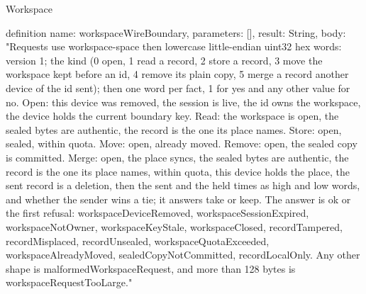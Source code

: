 \begin{lexlean}{Workspace}
\begin{semanticmodule}
definition{
  name: workspaceWireBoundary,
  parameters: [],
  result: String,
  body: "Requests use workspace-space then lowercase little-endian uint32 hex words: version 1; the kind (0 open, 1 read a record, 2 store a record, 3 move the workspace kept before an id, 4 remove its plain copy, 5 merge a record another device of the id sent); then one word per fact, 1 for yes and any other value for no. Open: this device was removed, the session is live, the id owns the workspace, the device holds the current boundary key. Read: the workspace is open, the sealed bytes are authentic, the record is the one its place names. Store: open, sealed, within quota. Move: open, already moved. Remove: open, the sealed copy is committed. Merge: open, the place syncs, the sealed bytes are authentic, the record is the one its place names, within quota, this device holds the place, the sent record is a deletion, then the sent and the held times as high and low words, and whether the sender wins a tie; it answers take or keep. The answer is ok or the first refusal: workspaceDeviceRemoved, workspaceSessionExpired, workspaceNotOwner, workspaceKeyStale, workspaceClosed, recordTampered, recordMisplaced, recordUnsealed, workspaceQuotaExceeded, workspaceAlreadyMoved, sealedCopyNotCommitted, recordLocalOnly. Any other shape is malformedWorkspaceRequest, and more than 128 bytes is workspaceRequestTooLarge."
}
\end{semanticmodule}
\end{lexlean}
